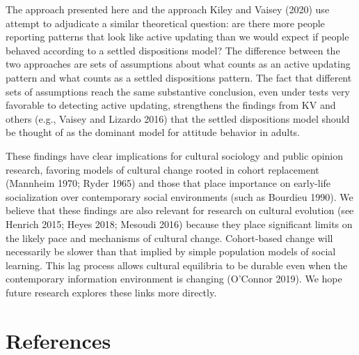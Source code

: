 \documentclass[
  11pt,
]{article}
\begin{document}
The approach presented here and the approach Kiley and Vaisey (2020) use attempt to adjudicate a similar theoretical question: are there more people reporting patterns that look like active updating than we would expect if people behaved according to a settled dispositions model? The difference between the two approaches are sets of assumptions about what counts as an active updating pattern and what counts as a settled dispositions pattern. The fact that different sets of assumptions reach the same substantive conclusion, even under tests very favorable to detecting active updating, strengthens the findings from KV and others (e.g., Vaisey and Lizardo 2016) that the settled dispositions model should be thought of as the dominant model for attitude behavior in adults.

These findings have clear implications for cultural sociology and public opinion research, favoring models of cultural change rooted in cohort replacement (Mannheim 1970; Ryder 1965) and those that place importance on early-life socialization over contemporary social environments (such as Bourdieu 1990). We believe that these findings are also relevant for research on cultural evolution (see Henrich 2015; Heyes 2018; Mesoudi 2016) because they place significant limits on the likely pace and mechanisms of cultural change. Cohort-based change will necessarily be slower than that implied by simple population models of social learning. This lag process allows cultural equilibria to be durable even when the contemporary information environment is changing (O'Connor 2019). We hope future research explores these links more directly.

\newpage

\hypertarget{references}{%
\section*{References}\label{references}}
\end{document}
